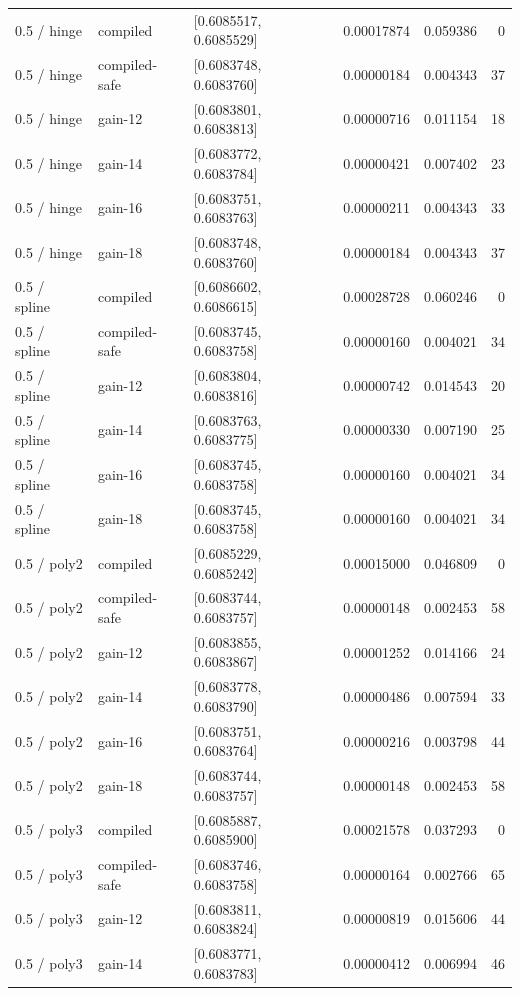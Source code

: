 \begin{longtable}{@{}lllrrr@{}}
0.5 / hinge & compiled & [0.6085517, 0.6085529] & 0.00017874 & 0.059386 & 0\\
0.5 / hinge & compiled-safe & [0.6083748, 0.6083760] & 0.00000184 & 0.004343 & 37\\
0.5 / hinge & gain-12 & [0.6083801, 0.6083813] & 0.00000716 & 0.011154 & 18\\
0.5 / hinge & gain-14 & [0.6083772, 0.6083784] & 0.00000421 & 0.007402 & 23\\
0.5 / hinge & gain-16 & [0.6083751, 0.6083763] & 0.00000211 & 0.004343 & 33\\
0.5 / hinge & gain-18 & [0.6083748, 0.6083760] & 0.00000184 & 0.004343 & 37\\
0.5 / spline & compiled & [0.6086602, 0.6086615] & 0.00028728 & 0.060246 & 0\\
0.5 / spline & compiled-safe & [0.6083745, 0.6083758] & 0.00000160 & 0.004021 & 34\\
0.5 / spline & gain-12 & [0.6083804, 0.6083816] & 0.00000742 & 0.014543 & 20\\
0.5 / spline & gain-14 & [0.6083763, 0.6083775] & 0.00000330 & 0.007190 & 25\\
0.5 / spline & gain-16 & [0.6083745, 0.6083758] & 0.00000160 & 0.004021 & 34\\
0.5 / spline & gain-18 & [0.6083745, 0.6083758] & 0.00000160 & 0.004021 & 34\\
0.5 / poly2 & compiled & [0.6085229, 0.6085242] & 0.00015000 & 0.046809 & 0\\
0.5 / poly2 & compiled-safe & [0.6083744, 0.6083757] & 0.00000148 & 0.002453 & 58\\
0.5 / poly2 & gain-12 & [0.6083855, 0.6083867] & 0.00001252 & 0.014166 & 24\\
0.5 / poly2 & gain-14 & [0.6083778, 0.6083790] & 0.00000486 & 0.007594 & 33\\
0.5 / poly2 & gain-16 & [0.6083751, 0.6083764] & 0.00000216 & 0.003798 & 44\\
0.5 / poly2 & gain-18 & [0.6083744, 0.6083757] & 0.00000148 & 0.002453 & 58\\
0.5 / poly3 & compiled & [0.6085887, 0.6085900] & 0.00021578 & 0.037293 & 0\\
0.5 / poly3 & compiled-safe & [0.6083746, 0.6083758] & 0.00000164 & 0.002766 & 65\\
0.5 / poly3 & gain-12 & [0.6083811, 0.6083824] & 0.00000819 & 0.015606 & 44\\
0.5 / poly3 & gain-14 & [0.6083771, 0.6083783] & 0.00000412 & 0.006994 & 46\\

\end{longtable}
